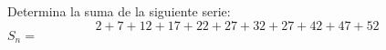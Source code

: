 
\question Determina la suma de la siguiente serie:
\[
2 + 7 + 12 + 17 + 22 + 27 + 32 + 27 + 42 + 47 + 52
\]
$S_n=$\fillin[297]

